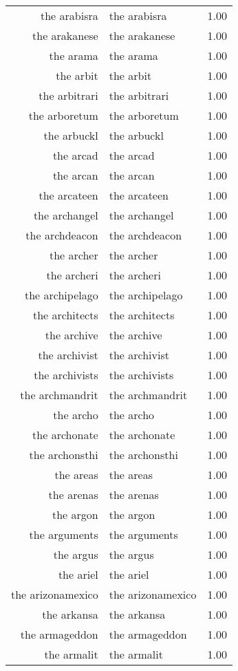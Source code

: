 \begin{table}[ht]
\begin{tabular}{rlr}
  the arabisra & the arabisra & 1.00 \\ 
  the arakanese & the arakanese & 1.00 \\ 
  the arama & the arama & 1.00 \\ 
  the arbit & the arbit & 1.00 \\ 
  the arbitrari & the arbitrari & 1.00 \\ 
  the arboretum & the arboretum & 1.00 \\ 
  the arbuckl & the arbuckl & 1.00 \\ 
  the arcad & the arcad & 1.00 \\ 
  the arcan & the arcan & 1.00 \\ 
  the arcateen & the arcateen & 1.00 \\ 
  the archangel & the archangel & 1.00 \\ 
  the archdeacon & the archdeacon & 1.00 \\ 
  the archer & the archer & 1.00 \\ 
  the archeri & the archeri & 1.00 \\ 
  the archipelago & the archipelago & 1.00 \\ 
  the architects & the architects & 1.00 \\ 
  the archive & the archive & 1.00 \\ 
  the archivist & the archivist & 1.00 \\ 
  the archivists & the archivists & 1.00 \\ 
  the archmandrit & the archmandrit & 1.00 \\ 
  the archo & the archo & 1.00 \\ 
  the archonate & the archonate & 1.00 \\ 
  the archonsthi & the archonsthi & 1.00 \\ 
  the areas & the areas & 1.00 \\ 
  the arenas & the arenas & 1.00 \\ 
  the argon & the argon & 1.00 \\ 
  the arguments & the arguments & 1.00 \\ 
  the argus & the argus & 1.00 \\ 
  the ariel & the ariel & 1.00 \\ 
  the arizonamexico & the arizonamexico & 1.00 \\ 
  the arkansa & the arkansa & 1.00 \\ 
  the armageddon & the armageddon & 1.00 \\ 
  the armalit & the armalit & 1.00 \\ 

\end{tabular}
\end{table}
